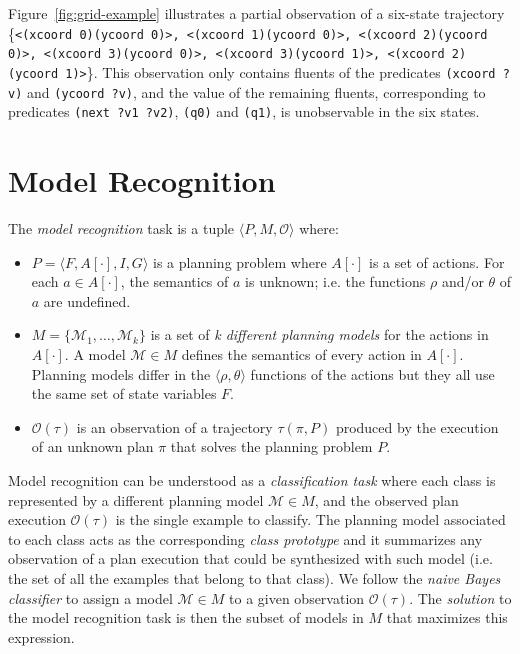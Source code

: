 \documentclass[letterpaper]{article} %
\newcommand{\tup}[1]{{\langle #1 \rangle}}
\begin{document}
Figure~\ref{fig:grid-example} illustrates a partial observation of a six-state trajectory \{{\tt\scriptsize<(xcoord 0)(ycoord 0)>, <(xcoord 1)(ycoord 0)>, <(xcoord 2)(ycoord 0)>, <(xcoord 3)(ycoord 0)>, <(xcoord 3)(ycoord 1)>, <(xcoord 2)(ycoord 1)>}\}. This observation only contains fluents of the predicates {\tt\small (xcoord ?v)} and {\tt\small (ycoord ?v)}, and the value of the remaining fluents, corresponding to predicates {\tt\small (next ?v1 ?v2)}, {\tt\small (q0)} and {\tt\small (q1)}, is unobservable in the six states.


\section{Model Recognition}
\label{sec:recognition}
The {\em model recognition} task is a tuple $\tup{P,M,\mathcal{O}}$ where:
\begin{itemize}
\item $P=\tup{F,A[\cdot],I,G}$ is a planning problem where $A[\cdot]$ is a set of actions. For each $a\in A[\cdot]$, the semantics of $a$ is unknown; i.e. the functions $\rho$ and/or $\theta$ of $a$ are undefined.
\item $M=\{\mathcal{M}_1,\ldots,\mathcal{M}_k\}$ is a set of {\em k different planning models} for the actions in $A[\cdot]$. A model $\mathcal{M}\in M$ defines the semantics of every action in $A[\cdot]$. Planning models differ in the $\tup{\rho,\theta}$ functions of the actions but they all use the same set of state variables $F$.
\item $\mathcal{O}(\tau)$ is an observation of a trajectory $\tau(\pi,P)$ produced by the execution of an unknown plan $\pi$ that solves the planning problem $P$.
\end{itemize}

Model recognition can be understood as a {\em classification task} where each class is represented by a different planning model $\mathcal{M}\in M$, and the observed plan execution $\mathcal{O}(\tau)$ is the single example to classify. The planning model associated to each class acts as the corresponding {\em class prototype} and it summarizes any observation of a plan execution that could be synthesized with such model (i.e. the set of all the examples that belong to that class). We follow the {\em naive Bayes classifier} to assign a model $\mathcal{M}\in M$ to a given observation $\mathcal{O}(\tau)$. The {\em solution} to the model recognition task is then the subset of models in $M$ that maximizes this expression.
\end{document}
